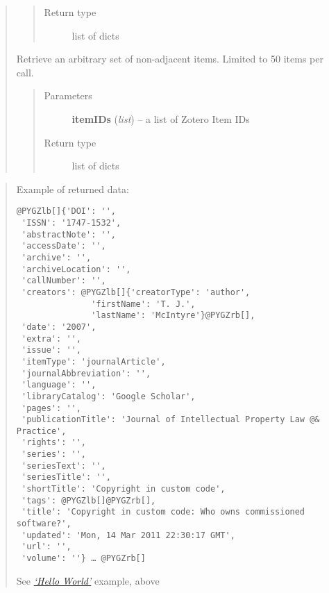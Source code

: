 \documentclass[letterpaper,10pt,english]{sphinxmanual}
\begin{document}
\begin{quote}
\begin{fulllineitems}
\begin{quote}
\begin{description}
\item[{Return type}] \leavevmode
list of dicts

\end{description}\end{quote}

\end{fulllineitems}



\begin{fulllineitems}
\label{index:pyzotero.zotero.Zotero.get_subset}
Retrieve an arbitrary set of non-adjacent items. Limited to 50 items per call.
\begin{quote}\begin{description}
\item[{Parameters}] \leavevmode
\textbf{itemIDs} (\emph{list}) -- a list of Zotero Item IDs

\item[{Return type}] \leavevmode
list of dicts

\end{description}\end{quote}

\end{fulllineitems}

\end{quote}
\label{index:returned}\begin{quote}

Example of returned data:

\begin{Verbatim}[commandchars=@\[\]]
@PYGZlb[]{'DOI': '',
 'ISSN': '1747-1532',
 'abstractNote': '',
 'accessDate': '',
 'archive': '',
 'archiveLocation': '',
 'callNumber': '',
 'creators': @PYGZlb[]{'creatorType': 'author',
               'firstName': 'T. J.',
               'lastName': 'McIntyre'}@PYGZrb[],
 'date': '2007',
 'extra': '',
 'issue': '',
 'itemType': 'journalArticle',
 'journalAbbreviation': '',
 'language': '',
 'libraryCatalog': 'Google Scholar',
 'pages': '',
 'publicationTitle': 'Journal of Intellectual Property Law @& Practice',
 'rights': '',
 'series': '',
 'seriesText': '',
 'seriesTitle': '',
 'shortTitle': 'Copyright in custom code',
 'tags': @PYGZlb[]@PYGZrb[],
 'title': 'Copyright in custom code: Who owns commissioned software?',
 'updated': 'Mon, 14 Mar 2011 22:30:17 GMT',
 'url': '',
 'volume': ''} … @PYGZrb[]
\end{Verbatim}

See {\hyperref[index:hello-world]{\emph{`Hello World'}}} example, above
\end{quote}
\end{document}
